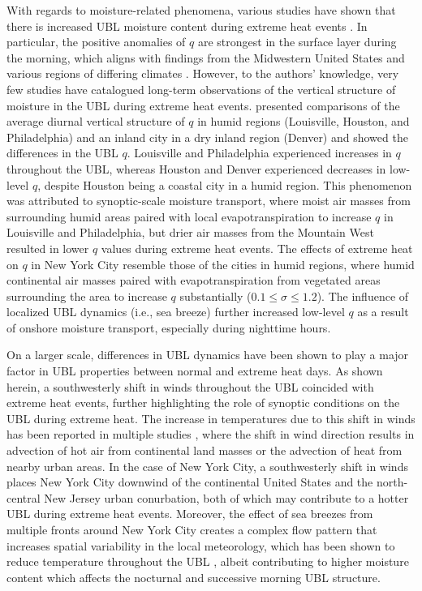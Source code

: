 With regards to moisture-related phenomena, various studies have shown that there is increased UBL moisture content during extreme heat events \citep{kunkel1996, pyrgou2020, zhang2020}. In particular, the positive anomalies of $q$ are strongest in the surface layer during the morning, which aligns with findings from the Midwestern United States \citep{kunkel1996} and various regions of differing climates \citep{zhang2020}. However, to the authors' knowledge, very few studies have catalogued long-term observations of the vertical structure of moisture in the UBL during extreme heat events. \citet{zhang2020} presented comparisons of the average diurnal vertical structure of $q$ in humid regions (Louisville, Houston, and Philadelphia) and an inland city in a dry inland region (Denver) and showed the differences in the UBL $q$. Louisville and Philadelphia experienced increases in $q$ throughout the UBL, whereas Houston and Denver experienced decreases in low-level $q$, despite Houston being a coastal city in a humid region. This phenomenon was attributed to synoptic-scale moisture transport, where moist air masses from surrounding humid areas paired with local evapotranspiration to increase $q$ in Louisville and Philadelphia, but drier air masses from the Mountain West resulted in lower $q$ values during extreme heat events. The effects of extreme heat on $q$ in New York City resemble those of the cities in humid regions, where humid continental air masses paired with evapotranspiration from vegetated areas surrounding the area to increase $q$ substantially ($0.1 \leq \sigma \leq 1.2$). The influence of localized UBL dynamics (i.e., sea breeze) further increased low-level $q$ as a result of onshore moisture transport, especially during nighttime hours. 

On a larger scale, differences in UBL dynamics have been shown to play a major factor in UBL properties between normal and extreme heat days. As shown herein, a southwesterly shift in winds throughout the UBL coincided with extreme heat events, further highlighting the role of synoptic conditions on the UBL during extreme heat. The increase in temperatures due to this shift in winds has been reported in multiple studies \citep{heaviside2015, jiang2019, ramamurthy2017b}, where the shift in wind direction results in advection of hot air from continental land masses or the advection of heat from nearby urban areas. In the case of New York City, a southwesterly shift in winds places New York City downwind of the continental United States and the north-central New Jersey urban conurbation, both of which may contribute to a hotter UBL during extreme heat events. Moreover, the effect of sea breezes from multiple fronts around New York City creates a complex flow pattern that increases spatial variability in the local meteorology, which has been shown to reduce temperature throughout the UBL \citep{han2022, hirsch2021, lee2021}, albeit contributing to higher moisture content which affects the nocturnal and successive morning UBL structure. 


